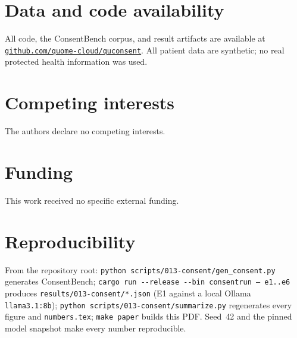 \documentclass[11pt]{article}
\providecommand{\EoneModel}{llama3.1:8b}
\begin{document}
\section*{Data and code availability}
All code, the ConsentBench corpus, and result artifacts are available at
\href{https://github.com/quome-cloud/quconsent}{\nolinkurl{github.com/quome-cloud/quconsent}}.
All patient data are synthetic; no real protected health information was used.

\section*{Competing interests}
The authors declare no competing interests.

\section*{Funding}
This work received no specific external funding.

\appendix
\section{Reproducibility}
From the repository root: \texttt{python scripts/013-consent/gen\_consent.py}
generates ConsentBench; \texttt{cargo run -{}-release -{}-bin consentrun -- e1..e6}
produces \texttt{results/013-consent/*.json} (E1 against a local Ollama
\texttt{\EoneModel{}}); \texttt{python scripts/013-consent/summarize.py} regenerates
every figure and \texttt{numbers.tex}; \texttt{make paper} builds this PDF. Seed~42
and the pinned model snapshot make every number reproducible.

\clearpage


\end{document}
